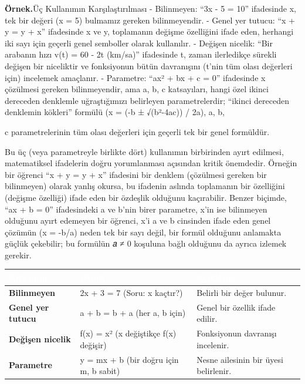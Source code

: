 \begin{tcolorbox}[bookbox,colback=cEx]\textbf{\textsf{\textcolor{cAcc}{Örnek.}}}\quad Üç Kullanımın Karşılaştırılması - Bilinmeyen: “3x - 5 = 10” ifadesinde x, tek bir değeri (x = 5) bulmamız gereken bilinmeyendir. - Genel yer tutucu: “x + y = y + x” ifadesinde x ve y, toplamanın değişme özelliğini ifade eden, herhangi iki sayı için geçerli genel semboller olarak kullanılır. - Değişen nicelik: “Bir arabanın hızı v(t) = 60 - 2t (km/sa)” ifadesinde t, zaman ilerledikçe sürekli değişen bir niceliktir ve fonksiyonun bütün davranışını (t’nin tüm olası değerleri için) incelemek amaçlanır. - Parametre: “ax² + bx + c = 0” ifadesinde x çözülmesi gereken bilinmeyendir, ama a, b, c katsayıları, hangi özel ikinci dereceden denklemle uğraştığımızı belirleyen parametrelerdir; “ikinci dereceden denklemin kökleri” formülü (x = (-b ± √(b²-4ac)) / 2a), a, b,\end{tcolorbox}

c parametrelerinin tüm olası değerleri için geçerli tek bir genel formüldür.

Bu üç (veya parametreyle birlikte dört) kullanımın birbirinden ayırt edilmesi, matematiksel ifadelerin doğru yorumlanması açısından kritik önemdedir. Örneğin bir öğrenci “x + y = y + x” ifadesini bir denklem (çözülmesi gereken bir bilinmeyen) olarak yanlış okursa, bu ifadenin aslında toplamanın bir özelliğini (değişme özelliği) ifade eden bir özdeşlik olduğunu kaçırabilir. Benzer biçimde, “ax + b = 0” ifadesindeki a ve b’nin birer parametre, x’in ise bilinmeyen olduğunu ayırt edemeyen bir öğrenci, x’i a ve b cinsinden ifade eden genel çözümün (x = -b/a) neden tek bir sayı değil, bir formül olduğunu anlamakta güçlük çekebilir; bu formülün 𝑎 ≠ 0 koşuluna bağlı olduğunu da ayrıca izlemek gerekir.

\par\smallskip\begin{center}{\renewcommand{\arraystretch}{1.25}\footnotesize\begin{tabularx}{\linewidth}{|>{\raggedright\arraybackslash}p{2.35cm}|>{\raggedright\arraybackslash}p{3.21cm}|Y|}\hline
{}\textcolor{white}{\bfseries Kullanım} & \textcolor{white}{\bfseries Örnek} & \textcolor{white}{\bfseries Açıklama} \\ \hline
\textbf{Bilinmeyen} & 2x + 3 = 7  (Soru: x kaçtır?) & Belirli bir değer bulunur. \\ \hline
\textbf{Genel yer tutucu} & a + b = b + a  (her a, b için) & Genel bir özellik ifade edilir. \\ \hline
\textbf{Değişen nicelik} & f(x) = x²  (x değiştikçe f(x) değişir) & Fonksiyonun davranışı incelenir. \\ \hline
\textbf{Parametre} & y = mx + b  (bir doğru için m, b sabit) & Nesne ailesinin bir üyesi belirlenir. \\ \hline
\end{tabularx}}\end{center}\par\smallskip

